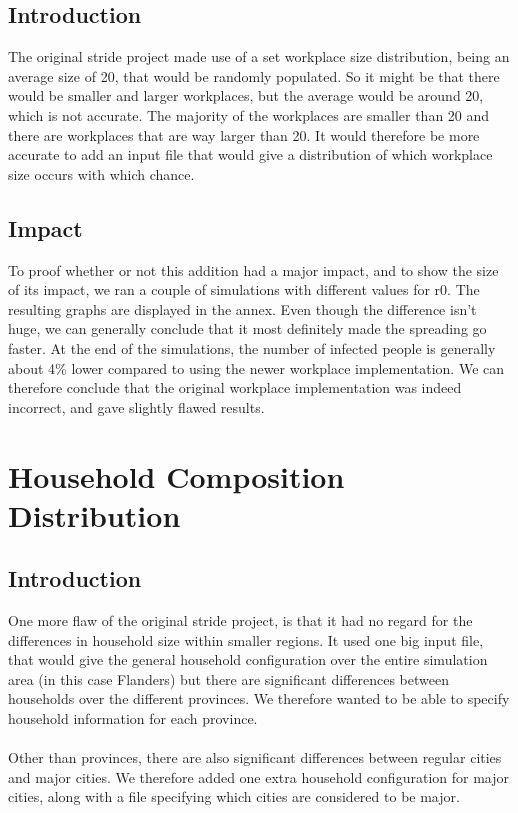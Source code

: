 \documentclass[runningheads]{llncs}
\begin{document}
	\subsection{Introduction}
	The original stride project made use of a set workplace size distribution, being an average size of 20, that would be randomly populated. So it might be that there would be smaller and larger workplaces, but the average would be around 20, which is not accurate. The majority of the workplaces are smaller than 20 and there are workplaces that are way larger than 20. It would therefore be more accurate to add an input file that would give a distribution of which workplace size occurs with which chance.

	\subsection{Impact}
	To proof whether or not this addition had a major impact, and to show the size of its impact, we ran a couple of simulations with different values for r0. The resulting graphs are displayed in the annex. Even though the difference isn't huge, we can generally conclude that it most definitely made the spreading go faster. At the end of the simulations, the number of infected people is generally about 4\% lower compared to using the newer workplace implementation. We can therefore conclude that the original workplace implementation was indeed incorrect, and gave slightly flawed results.
	\section{Household Composition Distribution}
	\subsection{Introduction}
	One more flaw of the original stride project, is that it had no regard for the differences in household size within smaller regions. It used one big input file, that would give the general household configuration over the entire simulation area (in this case Flanders) but there are significant differences between households over the different provinces. We therefore wanted to be able to specify household information for each province. \\
	\\
	Other than provinces, there are also significant differences between regular cities and major cities. We therefore added one extra household configuration for major cities, along with a file specifying which cities are considered to be major.
\end{document}

